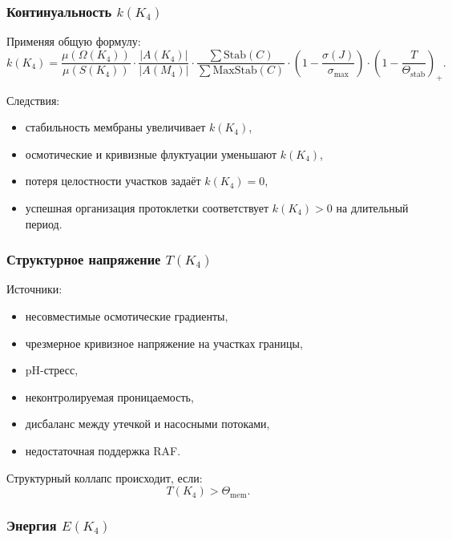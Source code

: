 \subsubsection{Континуальность \texorpdfstring{$k(K_4)$}{k(K_4)}}

Применяя общую формулу:
\[
k(K_4) =
\frac{\mu(\Omega(K_4))}{\mu(S(K_4))}
\cdot
\frac{|A(K_4)|}{|A(M_4)|}
\cdot
\frac{\sum \mathrm{Stab}(C)}{\sum \mathrm{MaxStab}(C)}
\cdot
(1 - \frac{\sigma(J)}{\sigma_{\max}})
\cdot
(1 - \frac{T}{\Theta_{\mathrm{stab}}})_+.
\]

Следствия:
\begin{itemize}
    \item стабильность мембраны увеличивает $k(K_4)$,
    \item осмотические и кривизные флуктуации уменьшают $k(K_4)$,
    \item потеря целостности участков задаёт $k(K_4)=0$,
    \item успешная организация протоклетки соответствует
          $k(K_4)>0$ на длительный период.
\end{itemize}

\subsubsection{Структурное напряжение \texorpdfstring{$T(K_4)$}{T(K_4)}}

Источники:
\begin{itemize}
    \item несовместимые осмотические градиенты,
    \item чрезмерное кривизное напряжение на участках границы,
    \item pH-стресс,
    \item неконтролируемая проницаемость,
    \item дисбаланс между утечкой и насосными потоками,
    \item недостаточная поддержка RAF.
\end{itemize}

Структурный коллапс происходит, если:
\[
T(K_4) > \Theta_{\mathrm{mem}}.
\]

\subsubsection{Энергия \texorpdfstring{$E(K_4)$}{E(K_4)}}


